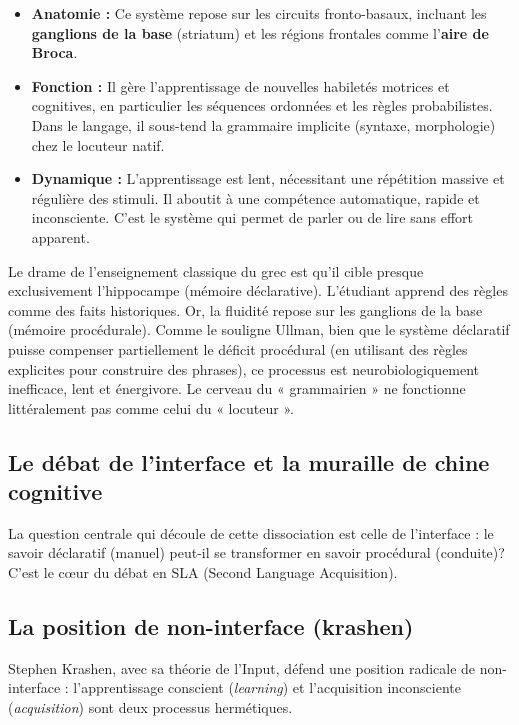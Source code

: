 \begin{itemize}\item \textbf{Anatomie :} Ce système repose sur les circuits fronto-basaux, incluant les \textbf{ganglions de la base} (striatum) et les régions frontales comme l'\textbf{aire de Broca}.\item \textbf{Fonction :} Il gère l'apprentissage de nouvelles habiletés motrices et cognitives, en particulier les séquences ordonnées et les règles probabilistes. Dans le langage, il sous-tend la grammaire implicite (syntaxe, morphologie) chez le locuteur natif.\item \textbf{Dynamique :} L'apprentissage est lent, nécessitant une répétition massive et régulière des stimuli. Il aboutit à une compétence automatique, rapide et inconsciente. C'est le système qui permet de parler ou de lire sans effort apparent.\cite{III-3-3-ref21}\end{itemize}Le drame de l'enseignement classique du grec est qu'il cible presque exclusivement l'hippocampe
(mémoire déclarative). L'étudiant apprend des règles comme des faits historiques. Or, la fluidité
repose sur les ganglions de la base (mémoire procédurale). Comme le souligne Ullman, bien que le
système déclaratif puisse compenser partiellement le déficit procédural (en utilisant des règles
explicites pour construire des phrases), ce processus est neurobiologiquement inefficace, lent et
énergivore.\cite{III-3-3-ref18} Le cerveau du « grammairien » ne fonctionne littéralement pas comme
celui du « locuteur ».



\subsection{Le débat de l'interface et la muraille de chine cognitive}

La question centrale qui découle de cette dissociation est celle de l'interface : le savoir
déclaratif (manuel) peut-il se transformer en savoir procédural (conduite)? C'est le cœur du débat
en SLA (Second Language Acquisition).



\subsection{La position de non-interface (krashen)}

Stephen Krashen, avec sa théorie de l'Input, défend une position radicale de non-interface :
l'apprentissage conscient (\textit{learning}) et l'acquisition inconsciente (\textit{acquisition})
sont deux processus hermétiques.\cite{III-3-3-ref23}

